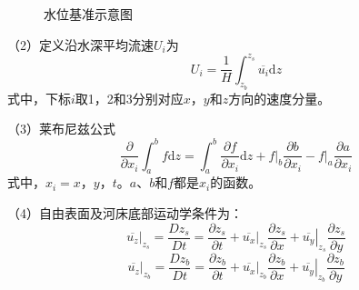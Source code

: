 \begin{figure}
  \begin{tikzpicture}
  \end{tikzpicture}
  \caption{水位基准示意图}
\end{figure}

（2）定义沿水深平均流速$U_i$为
\begin{equation}
  U_i
  =
  \frac{1}{H}
\int_{z_{b}}^{ z_{s}}\!\overline{u_{i}}\mathrm{d}z
\end{equation}
式中，下标$i$取1，2和3分别对应$x$，$y$和$z$方向的速度分量。

（3）莱布尼兹公式
\begin{equation}
  \frac{\partial}{\partial x_{i}}
  \int_{a}^{b}\!f\mathrm{d}z
  =
  \int_{a}^{b}\!
  \frac{\partial f}{\partial x_{i}}\mathrm{d}z
  +
  \left.f\right|_{b}\frac{\partial b}{\partial x_{i}}
  -
  \left.f\right|_{a}\frac{\partial a}{\partial x_{i}}
    \label{EqCGeLeibnizLaw}
\end{equation}
式中，$x_{i}=x$，$y$，$t$。$a$、$b$和$f$都是$x_{i}$的函数。

（4）自由表面及河床底部运动学条件为：
\begin{equation}
  \left.\overline{u_{z}}\right|_{z_{s}}
    =
    \frac{D z_{s}}{Dt}
    =
    \frac{\partial z_{s}}{\partial t}
    +
    \left.\overline{u_{x}}\right|_{z_{s}}\frac{\partial z_{s}}{\partial x}
      +
    \left.\overline{u_{y}}\right|_{z_{s}}\frac{\partial z_{s}}{\partial y}
    \label{EqCGeSMC}
\end{equation}
\begin{equation}
  \left.\overline{u_{z}}\right|_{z_{b}}
    =
    \frac{Dz_{b}}{Dt}
    =
    \frac{\partial z_{b}}{\partial t}
    +
    \left.\overline{u_{x}}\right|_{z_{b}}\frac{\partial z_{b}}{\partial x}
      +
    \left.\overline{u_{y}}\right|_{z_{b}}\frac{\partial z_{b}}{\partial y}
    \label{EqCGeBMC}
\end{equation}

